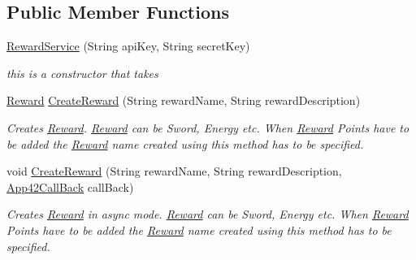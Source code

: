 \subsection*{Public Member Functions}
\begin{DoxyCompactItemize}
\item 
\hyperlink{classcom_1_1shephertz_1_1app42_1_1paas_1_1sdk_1_1csharp_1_1reward_1_1_reward_service_a0f355270f4fef36ca6fa896b39aacd68}{Reward\+Service} (String api\+Key, String secret\+Key)
\begin{DoxyCompactList}\small\item\em this is a constructor that takes \end{DoxyCompactList}\item 
\hyperlink{classcom_1_1shephertz_1_1app42_1_1paas_1_1sdk_1_1csharp_1_1reward_1_1_reward}{Reward} \hyperlink{classcom_1_1shephertz_1_1app42_1_1paas_1_1sdk_1_1csharp_1_1reward_1_1_reward_service_affaa3378981a478d880f99559a431a5a}{Create\+Reward} (String reward\+Name, String reward\+Description)
\begin{DoxyCompactList}\small\item\em Creates \hyperlink{classcom_1_1shephertz_1_1app42_1_1paas_1_1sdk_1_1csharp_1_1reward_1_1_reward}{Reward}. \hyperlink{classcom_1_1shephertz_1_1app42_1_1paas_1_1sdk_1_1csharp_1_1reward_1_1_reward}{Reward} can be Sword, Energy etc. When \hyperlink{classcom_1_1shephertz_1_1app42_1_1paas_1_1sdk_1_1csharp_1_1reward_1_1_reward}{Reward} Points have to be added the \hyperlink{classcom_1_1shephertz_1_1app42_1_1paas_1_1sdk_1_1csharp_1_1reward_1_1_reward}{Reward} name created using this method has to be specified. \end{DoxyCompactList}\item 
void \hyperlink{classcom_1_1shephertz_1_1app42_1_1paas_1_1sdk_1_1csharp_1_1reward_1_1_reward_service_ac47ad8fb0b1f5c3217396e96e90ec95c}{Create\+Reward} (String reward\+Name, String reward\+Description, \hyperlink{interfacecom_1_1shephertz_1_1app42_1_1paas_1_1sdk_1_1csharp_1_1_app42_call_back}{App42\+Call\+Back} call\+Back)
\begin{DoxyCompactList}\small\item\em Creates \hyperlink{classcom_1_1shephertz_1_1app42_1_1paas_1_1sdk_1_1csharp_1_1reward_1_1_reward}{Reward} in async mode. \hyperlink{classcom_1_1shephertz_1_1app42_1_1paas_1_1sdk_1_1csharp_1_1reward_1_1_reward}{Reward} can be Sword, Energy etc. When \hyperlink{classcom_1_1shephertz_1_1app42_1_1paas_1_1sdk_1_1csharp_1_1reward_1_1_reward}{Reward} Points have to be added the \hyperlink{classcom_1_1shephertz_1_1app42_1_1paas_1_1sdk_1_1csharp_1_1reward_1_1_reward}{Reward} name created using this method has to be specified. \end{DoxyCompactList}\item 

\end{DoxyCompactItemize}
